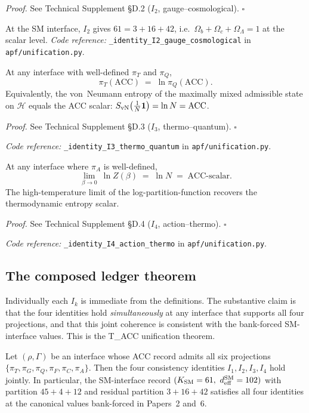 \documentclass[11pt]{article}
\newcommand{\coderef}[2]{\smallskip\noindent\textit{Code reference:} \texttt{#1} in \texttt{#2}.}
\begin{document}
\noindent\textit{Proof.} See Technical Supplement \S D.2 ($I_2$, gauge--cosmological). \hfill$\square$

\smallskip

At the SM interface, $I_2$ gives $61 = 3 + 16 + 42$, i.e.\ $\Omega_b + \Omega_c + \Omega_\Lambda = 1$ at the scalar level. \coderef{\_identity\_I2\_gauge\_cosmological}{apf/unification.py}

\begin{tcolorbox}[apfbox, title={Identity $I_3$ (Thermo--Quantum)}]
At any interface with well-defined $\pi_T$ and $\pi_Q$,
\[
\pi_T(\mathrm{ACC}) \;=\; \ln\pi_Q(\mathrm{ACC}).
\]
Equivalently, the von~Neumann entropy of the maximally mixed admissible state on $\mathcal{H}$ equals the ACC scalar: $S_{\rm vN}\!\left(\tfrac{1}{N}\mathbf{1}\right) = \ln N = \mathrm{ACC}$.
\end{tcolorbox}

\noindent\textit{Proof.} See Technical Supplement \S D.3 ($I_3$, thermo--quantum). \hfill$\square$

\smallskip

\coderef{\_identity\_I3\_thermo\_quantum}{apf/unification.py}

\begin{tcolorbox}[apfbox, title={Identity $I_4$ (Action--Thermo)}]
At any interface where $\pi_A$ is well-defined,
\[
\lim_{\beta \to 0}\ \ln Z(\beta) \;=\; \ln N \;=\; \mathrm{ACC}\text{-scalar}.
\]
The high-temperature limit of the log-partition-function recovers the thermodynamic entropy scalar.
\end{tcolorbox}

\noindent\textit{Proof.} See Technical Supplement \S D.4 ($I_4$, action--thermo). \hfill$\square$

\smallskip

\coderef{\_identity\_I4\_action\_thermo}{apf/unification.py}

\subsection{The composed ledger theorem}\label{sec:ledger_unification}

Individually each $I_k$ is immediate from the definitions. The substantive claim is that the four identities hold \emph{simultaneously} at any interface that supports all four projections, and that this joint coherence is consistent with the bank-forced SM-interface values. This is the T\_ACC unification theorem.

\begin{tcolorbox}[apfbox, title={Theorem T\_ACC unification}]
Let $(\rho,\Gamma)$ be an interface whose ACC record admits all six projections $\{\pi_T, \pi_G, \pi_Q, \pi_F, \pi_C, \pi_A\}$. Then the four consistency identities $I_1, I_2, I_3, I_4$ hold jointly. In particular, the SM-interface record $(K_{\rm SM}=61,\ d_{\rm eff}^{\rm SM}=102)$ with partition $45+4+12$ and residual partition $3+16+42$ satisfies all four identities at the canonical values bank-forced in Papers~2 and~6.
\end{tcolorbox}
\end{document}
